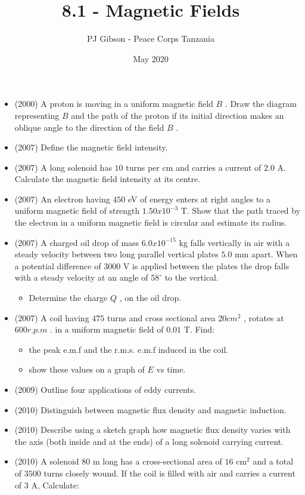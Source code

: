 \documentclass{article}
\title{\textbf{8.1 - Magnetic Fields}}
\author{PJ Gibson - Peace Corps Tanzania}
\date{May 2020}
\begin{document}
\maketitle

\begin{itemize}
\item (2000)  A proton is moving in a uniform magnetic field $ B$ . Draw the diagram representing $ B$ and the path of the proton if its initial direction makes an oblique angle to the direction of the field $ B$ . 
\item (2007)  Define the magnetic field intensity.
\item (2007)  A long solenoid has $ 10$ turns per cm and carries a current of $ 2.0$ A.  Calculate the magnetic field intensity at its centre.
\item (2007)  An electron having $ 450$ eV of energy enters at right angles to a uniform magnetic field of strength $ 1.50x10^{-3}$ T.  Show that the path traced by the electron in a uniform magnetic field is circular and estimate its radius.
\item (2007)  A charged oil drop of mass $ 6.0x10^{-15}$ kg falls vertically in air with a steady velocity between two long parallel vertical plates $ 5.0$ mm apart.  When a potential difference of $ 3000$ V is applied between the plates the drop falls with a steady velocity at an angle of $ 58^{\circ}$ to the vertical.
 \begin{itemize}
\item Determine the charge $ Q$ , on the oil drop.
\end{itemize}
\item (2007)  A coil having $ 475$ turns and cross sectional area $ 20 cm^{2}$ , rotates at $ 600r.p.m$ . in a uniform magnetic field of $ 0.01$ T. Find:
 \begin{itemize}
\item the peak e.m.f and the r.m.s. e.m.f induced in the coil. 
\item show these values on a graph of $ E$ vs time. 
\end{itemize}
\item (2009)  Outline four applications of eddy currents.
\item (2010)  Distinguish between magnetic flux density and magnetic induction.
\item (2010)  Describe using a sketch graph how magnetic flux density varies with the axis (both inside and at the ends) of a long solenoid carrying current. 
\item (2010)  A solenoid $ 80$ m long has a cross-sectional area of $ 16$ cm$ ^{2}$ and a total of $ 3500$ turns closely wound. If the coil is filled with air and carries a current of $ 3$ A, Calculate:

\end{itemize}
\end{document}
